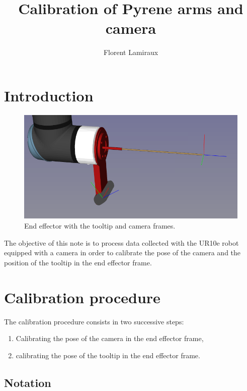 \documentclass {article}
\title {Calibration of Pyrene arms and camera}
\author {Florent Lamiraux}
\date {}
\begin{document}
\maketitle
\section{Introduction}

\begin{figure}
  \centerline{
    \includegraphics[width=.7\linewidth]{end-effector.png}
  }
  \caption{End effector with the tooltip and camera frames.}
  \label{fig:end-effector}
\end{figure}

The objective of this note is to process data collected with the UR10e robot
equipped with a camera in order to calibrate the pose of the camera and the position of the tooltip in the end effector frame.

\section{Calibration procedure}

The calibration procedure consists in two successive steps:
\begin{enumerate}
\item Calibrating the pose of the camera in the end effector frame,
\item calibrating the pose of the tooltip in the end effector frame.
\end{enumerate}

\subsection{Notation}
\end{document}
